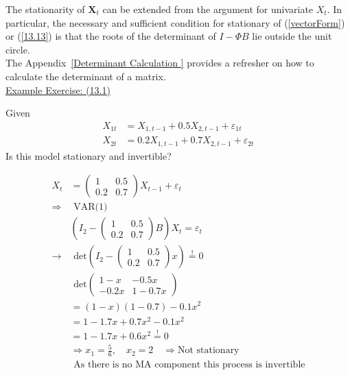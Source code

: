 The stationarity of $\mathbf{X}_t$ can be extended from the argument for univariate $X_t$. In particular, the necessary and sufficient condition for stationary of (\ref{vectorForm}) or (\ref{13.13}) is that the roots of the determinant of $I-\Phi B$ lie outside the unit circle. \\

The Appendix~\ref{Determinant Calculation } provides a refresher on how to calculate the determinant of a matrix.\\

\underline{Example Exercise: (13.1)} \\
\begin{footnotesize}
    

\quad Given \begin{align*}
    X_{1t} &= X_{1,t-1}+0.5X_{2,t-1} + \varepsilon_{1t}\\
    X_{2t} &= 0.2 X_{1,t-1} + 0.7 X_{2,t-1} + \varepsilon_{2t}
\end{align*} \quad Is this model stationary and invertible?

\begin{align*}
    X_t &= \begin{pmatrix}
        1 & 0.5 \\
        0.2 & 0.7
    \end{pmatrix}X_{t-1} + \varepsilon_t \\
    \Rightarrow &\text{ VAR(1)} \\
    & \left(I_2 - \begin{pmatrix}
        1 & 0.5 \\
        0.2 & 0.7
    \end{pmatrix}B\right)X_t = \varepsilon_t \\
    \rightarrow &\text{ det}\left(I_2 - \begin{pmatrix}
        1 & 0.5 \\
        0.2 & 0.7
    \end{pmatrix}x\right) \overset{!}{=} 0 \\
    &\text{ det}\begin{pmatrix}
        1-x & -0.5x \\
        -0.2x & 1-0.7x
    \end{pmatrix} \\
    &= (1-x)(1-0.7)-0.1x^2 \\
    &= 1-1.7x + 0.7x^2 -0.1x^2 \\
    &= 1-1.7x + 0.6x^2 \overset{!}{=} 0\\
&\Rightarrow x_1 = \frac{5}{6}, \quad x_2 = 2 \quad \Rightarrow\text{Not stationary}\\
&\text{ As there is no MA component this process is invertible}
\end{align*}

\end{footnotesize}


